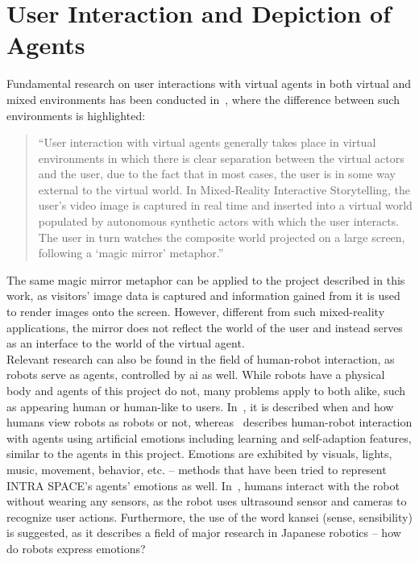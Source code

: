 \documentclass[draft,final]{vutinfth} %
\begin{document}
\section{User Interaction and Depiction of Agents}
\label{chap:userinteraction}

Fundamental research on user interactions with virtual agents in both virtual and mixed environments has been conducted in~\cite{10.1007/978-3-540-39396-2_39}, where the difference between such environments is highlighted:
\begin{quote}
	``User interaction with virtual agents generally takes place in virtual environments in which there is clear separation between the virtual actors and the user, due to the fact that in most cases, the user is in some way external to the virtual world. In Mixed-Reality Interactive Storytelling, the user’s video image is captured in real time and inserted into a virtual world populated by autonomous synthetic actors with which the user interacts. The user in turn watches the composite world projected on a large screen, following a `magic mirror' metaphor.''~\cite[p.~1]{10.1007/978-3-540-39396-2_39}
\end{quote}
The same magic mirror metaphor can be applied to the project described in this work, as \glspl{visitor}’ image data is captured and information gained from it is used to render images onto the screen. 
However, different from such mixed-reality applications, the mirror does not reflect the world of the user and instead serves as an interface to the world of the virtual agent. \\
Relevant research can also be found in the field of human-robot interaction, as robots serve as agents, controlled by \gls{ai} as well. 
While robots have a physical body and agents of this project do not, many problems apply to both alike, such as appearing human or human-like to users. 
In~\cite{stenzel2012humanoid}, it is described when and how humans view robots as robots or not, whereas~\cite{suzuki1998intelligent} describes human-robot interaction with agents using artificial emotions including learning and self-adaption features, similar to the agents in this project. 
Emotions are exhibited by visuals, lights, music, movement, behavior, etc. – methods that have been tried to represent INTRA SPACE’s agents’ emotions as well. 
In~\cite{suzuki1998intelligent}, humans interact with the robot without wearing any sensors, as the robot uses ultrasound sensor and cameras to recognize user actions. 
Furthermore, the use of the word kansei (sense, sensibility) is suggested, as it describes a field of major research in Japanese robotics – how do robots express emotions? \\
\end{document}
